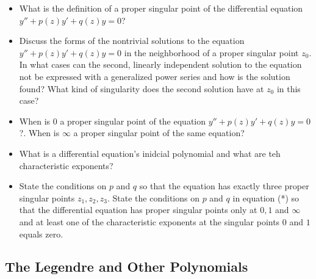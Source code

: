 \begin{itemize}

	\item What is the definition of a proper singular point of the differential equation $ y'' + p(z)y' + q(z)y = 0 $?
		
	\item Discuss the forms of the nontrivial solutions to the equation $ y'' + p(z)y' + q(z)y = 0 $ in the neighborhood of a proper singular point $ z_0 $. In what cases can the second, linearly independent solution to the equation not be expressed with a generalized power series and how is the solution found? What kind of singularity does the second solution have at $ z_0 $ in this case? 
	
	\item When is $ 0 $ a proper singular point of the equation $ y'' + p(z)y' + q(z)y = 0  $?. When is $ \infty $ a proper singular point of the same equation?
	
	\item What is a differential equation's inidcial polynomial and what are teh characteristic exponents?

	\item State the conditions on $ p $ and $ q $ so that the equation has exactly three proper singular points $ z_{1}, z_2, z_3 $. State the conditions on $ p $ and $ q $ in equation (*) so that the differential equation has proper singular points only at $ 0, 1 $ and $ \infty $ and at least one of the characteristic exponents at the singular points $ 0 $ and $ 1 $ equals zero.

\end{itemize}

\subsection{The Legendre and Other Polynomials}


